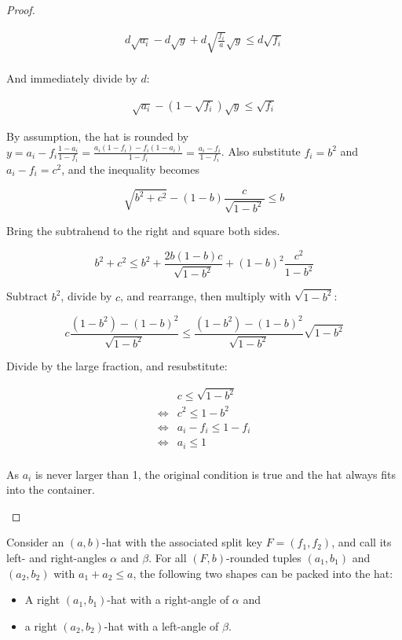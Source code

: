\documentclass[%
    a4paper,              %
    style=screen,          %
    bibliography=totoc,   %
    nexus,                %
    lnum,                 %
    extramargin,          %
]{tubsbook}
\begin{document}
\begin{proof}
\begin{itemize}
            \begin{align*}
                d\sqrt{a_i} - d\sqrt{y} + d\sqrt{\frac{f_i}{a}}\sqrt{y} \le d\sqrt{f_i}\\
            \end{align*}

            And immediately divide by $d$:

            \begin{align*}
                \sqrt{a_i} - (1-\sqrt{f_i})\sqrt{y} \le \sqrt{f_i}
            \end{align*}

            By assumption, the hat is rounded by $y = a_i - f_i\frac{1-a_i}{1-f_i} = \frac{a_i(1-f_i)-f_i(1-a_i)}{1-f_i} = \frac{a_i-f_i}{1-f_i}$.
            Also substitute $f_i = b^2$ and $a_i-f_i = c^2$, and the inequality becomes

            $$\sqrt{b^2+c^2} - (1-b)\frac{c}{\sqrt{1-b^2}} \le b$$

            Bring the subtrahend to the right and square both sides.

            $$b^2+c^2 \le b^2 + \frac{2b(1-b)c}{\sqrt{1-b^2}} + (1-b)^2\frac{c^2}{1-b^2}$$

            Subtract $b^2$, divide by $c$, and rearrange, then multiply with $\sqrt{1-b^2}$:

            $$c\frac{(1-b^2)-(1-b)^2}{\sqrt{1-b^2}} \le \frac{(1-b^2)-(1-b)^2}{\sqrt{1-b^2}}\sqrt{1-b^2}$$

            Divide by the large fraction, and resubstitute:

            \begin{align*}
                &c \le \sqrt{1-b^2}\\
                \iff &c^2 \le 1-b^2\\
                \iff &a_i - f_i \le 1-f_i\\
                \iff &a_i \le 1\\
            \end{align*}

            As $a_i$ is never larger than 1, the original condition is true and the hat always fits into the container.
    \end{itemize}
\end{proof}

\begin{lemma}\label{th:roundedhatsinhat}
    Consider an $(a,b)$-hat with the associated split key $F = (f_1, f_2)$, and call its left- and right-angles $\alpha$ and $\beta$.
    For all $(F,b)$-rounded tuples $(a_1, b_1)$ and $(a_2, b_2)$ with $a_1 + a_2 \le a$, the following two shapes can be packed into the hat:
    \begin{itemize}
        \item A right $(a_1,b_1)$-hat with a right-angle of $\alpha$ and
        \item a right $(a_2,b_2)$-hat with a left-angle of $\beta$.
    \end{itemize}
\end{lemma}
\end{document}
